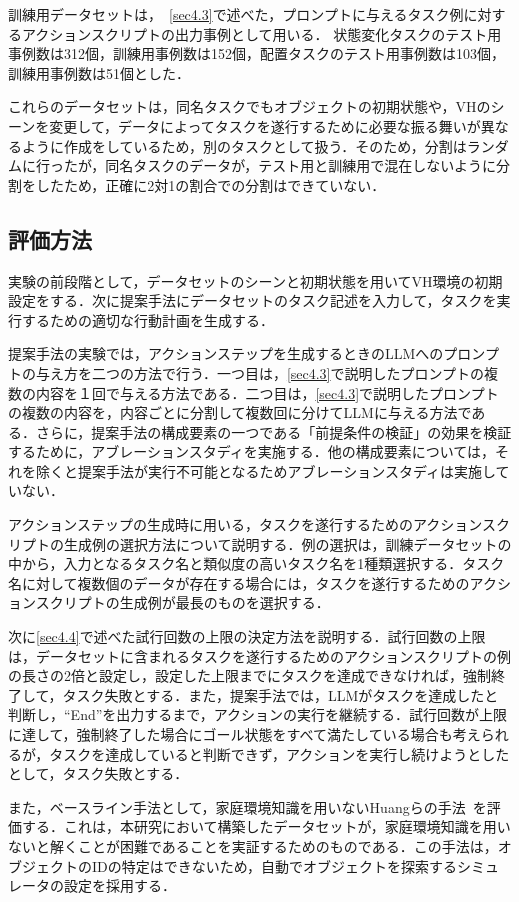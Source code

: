 訓練用データセットは，~\ref{sec4.3}で述べた，プロンプトに与えるタスク例に対するアクションスクリプトの出力事例として用いる．
状態変化タスクのテスト用事例数は312個，訓練用事例数は152個，配置タスクのテスト用事例数は103個，訓練用事例数は51個とした．

これらのデータセットは，同名タスクでもオブジェクトの初期状態や，VHのシーンを変更して，データによってタスクを遂行するために必要な振る舞いが異なるように作成をしているため，別のタスクとして扱う．そのため，分割はランダムに行ったが，同名タスクのデータが，テスト用と訓練用で混在しないように分割をしたため，正確に2対1の割合での分割はできていない．

\subsection{評価方法}\label{sec5.2}
実験の前段階として，データセットのシーンと初期状態を用いてVH環境の初期設定をする．次に提案手法にデータセットのタスク記述を入力して，タスクを実行するための適切な行動計画を生成する．

提案手法の実験では，アクションステップを生成するときのLLMへのプロンプトの与え方を二つの方法で行う．一つ目は，\ref{sec4.3}で説明したプロンプトの複数の内容を１回で与える方法である．二つ目は，\ref{sec4.3}で説明したプロンプトの複数の内容を，内容ごとに分割して複数回に分けてLLMに与える方法である．さらに，提案手法の構成要素の一つである「前提条件の検証」の効果を検証するために，アブレーションスタディを実施する．他の構成要素については，それを除くと提案手法が実行不可能となるためアブレーションスタディは実施していない．

アクションステップの生成時に用いる，タスクを遂行するためのアクションスクリプトの生成例の選択方法について説明する．例の選択は，訓練データセットの中から，入力となるタスク名と類似度の高いタスク名を1種類選択する．タスク名に対して複数個のデータが存在する場合には，タスクを遂行するためのアクションスクリプトの生成例が最長のものを選択する．

次に\ref{sec4.4}で述べた試行回数の上限の決定方法を説明する．試行回数の上限は，データセットに含まれるタスクを遂行するためのアクションスクリプトの例の長さの2倍と設定し，設定した上限までにタスクを達成できなければ，強制終了して，タスク失敗とする．また，提案手法では，LLMがタスクを達成したと判断し，``End''を出力するまで，アクションの実行を継続する．試行回数が上限に達して，強制終了した場合にゴール状態をすべて満たしている場合も考えられるが，タスクを達成していると判断できず，アクションを実行し続けようとしたとして，タスク失敗とする．

また，ベースライン手法として，家庭環境知識を用いないHuangらの手法~\cite{huang22}を評価する．これは，本研究において構築したデータセットが，家庭環境知識を用いないと解くことが困難であることを実証するためのものである．この手法は，オブジェクトのIDの特定はできないため，自動でオブジェクトを探索するシミュレータの設定を採用する．

